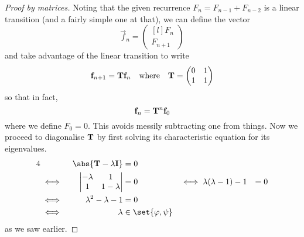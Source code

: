 \begin{proof}[Proof by matrices]
 Noting that the given recurrence \(F_n = F_{n - 1} + F_{n - 2}\) is a linear
 transition (and a fairly simple one at that), we can define the vector
 \begin{equation*}
  \vec f_n =
  \begin{pmatrix*}[l]
   F_n \\
   F_{n + 1}
  \end{pmatrix*}
 \end{equation*}
 and take advantage of the linear transition to write
 \begin{equation*}
  \mathrm{\mathbf{f}}_{n + 1} = \mathbf{T} \mathrm{\mathbf{f}}_n \quad \text{where} \quad
  \mathbf{T} =
  \begin{pmatrix}
   0 & 1 \\
   1 & 1
  \end{pmatrix}
 \end{equation*}
 so that in fact,
 \begin{equation*}
  \mathrm{\mathbf{f}}_n = \mathbf{T}^n\mathrm{\mathbf{f}}_0
 \end{equation*}
 where we define \(F_0 = 0\). This avoids messily subtracting one from
 things. Now we proceed to diagonalise \(\mathbf{T}\) by first solving its
 characteristic equation for its eigenvalues.
 \begin{alignat*}4
  && \abs{\mat T - \lambda \mat I} &= 0 \\
  &\iff{}&
   \begin{vmatrix}
    -\lambda & 1 \\
    1 & 1 - \lambda
   \end{vmatrix} &= 0
  &\iff{}& \lambda (\lambda - 1) - 1 &= 0 \\
  &\iff{}& \lambda^2 - \lambda - 1 &= 0 \\
  &\iff{}& \lambda &\in \set{\varphi, \psi}
 \end{alignat*}
 as we saw earlier.


\end{proof}
